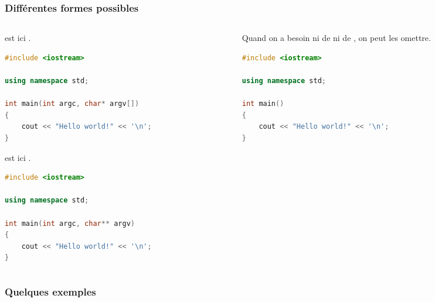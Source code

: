 \documentclass{cppcourses}
\begin{document}
\begin{frame}[fragile]

\frametitle{Différentes formes possibles}

\begin{columns}
    \begin{column}{0.5\textwidth}
\footnotesize

 est ici .

        \begin{lstlisting}[language = c++]
#include <iostream>

using namespace std;

int main(int argc, char* argv[])
{
    cout << "Hello world!" << '\n';
}
        \end{lstlisting}

 est ici .

        \begin{lstlisting}[language = c++]
#include <iostream>

using namespace std;

int main(int argc, char** argv)
{
    cout << "Hello world!" << '\n';
}
        \end{lstlisting}
    \end{column}
    \begin{column}{0.5\textwidth}
\footnotesize

Quand on a besoin ni de  ni de , on peut les omettre.

        \begin{lstlisting}[language = c++]
#include <iostream>

using namespace std;

int main()
{
    cout << "Hello world!" << '\n';
}
        \end{lstlisting}
    \end{column}
\end{columns}

\end{frame}

\subsubsection{Quelques exemples}
\end{document}
